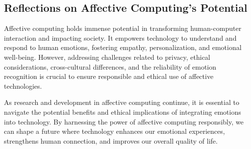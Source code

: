 \subsection{Reflections on Affective Computing's Potential}

Affective computing holds immense potential in transforming human-computer interaction and impacting society.
 It empowers technology to understand and respond to human emotions, fostering empathy, personalization, and emotional well-being. 
 However, addressing challenges related to privacy, ethical considerations, cross-cultural differences, and the reliability of emotion recognition 
 is crucial to ensure responsible and ethical use of affective technologies.

 As research and development in affective computing continue, it is essential to navigate the potential benefits and ethical implications of integrating emotions into technology. 
 By harnessing the power of affective computing responsibly, we can shape a future where technology enhances our emotional experiences, 
 strengthens human connection, and improves our overall quality of life.